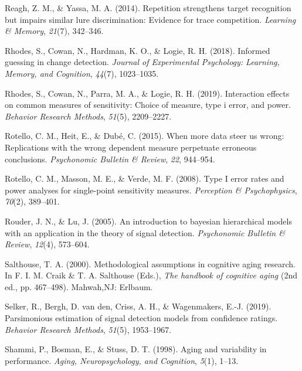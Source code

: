 \documentclass[
  english,
  ,man,floatsintext]{apa6}
\begin{document}
\leavevmode\hypertarget{ref-ReaghAndYassa2014}{}%
Reagh, Z. M., \& Yassa, M. A. (2014). Repetition strengthens target recognition but impairs similar lure discrimination: Evidence for trace competition. \emph{Learning \& Memory}, \emph{21}(7), 342--346.

\leavevmode\hypertarget{ref-RhodesEtAl2018}{}%
Rhodes, S., Cowan, N., Hardman, K. O., \& Logie, R. H. (2018). Informed guessing in change detection. \emph{Journal of Experimental Psychology: Learning, Memory, and Cognition}, \emph{44}(7), 1023--1035.

\leavevmode\hypertarget{ref-rhodes2019interaction}{}%
Rhodes, S., Cowan, N., Parra, M. A., \& Logie, R. H. (2019). Interaction effects on common measures of sensitivity: Choice of measure, type i error, and power. \emph{Behavior Research Methods}, \emph{51}(5), 2209--2227.

\leavevmode\hypertarget{ref-RotelloEtAl2015}{}%
Rotello, C. M., Heit, E., \& Dubé, C. (2015). When more data steer us wrong: Replications with the wrong dependent measure perpetuate erroneous conclusions. \emph{Psychonomic Bulletin \& Review}, \emph{22}, 944--954.

\leavevmode\hypertarget{ref-RotelloEtAl2008}{}%
Rotello, C. M., Masson, M. E., \& Verde, M. F. (2008). Type I error rates and power analyses for single-point sensitivity measures. \emph{Perception \& Psychophysics}, \emph{70}(2), 389--401.

\leavevmode\hypertarget{ref-rouder2005introduction}{}%
Rouder, J. N., \& Lu, J. (2005). An introduction to bayesian hierarchical models with an application in the theory of signal detection. \emph{Psychonomic Bulletin \& Review}, \emph{12}(4), 573--604.

\leavevmode\hypertarget{ref-Salthouse2000}{}%
Salthouse, T. A. (2000). Methodological assumptions in cognitive aging research. In F. I. M. Craik \& T. A. Salthouse (Eds.), \emph{The handbook of cognitive aging} (2nd ed., pp. 467--498). Mahwah,NJ: Erlbaum.

\leavevmode\hypertarget{ref-selker2019parsimonious}{}%
Selker, R., Bergh, D. van den, Criss, A. H., \& Wagenmakers, E.-J. (2019). Parsimonious estimation of signal detection models from confidence ratings. \emph{Behavior Research Methods}, \emph{51}(5), 1953--1967.

\leavevmode\hypertarget{ref-shammi1998aging}{}%
Shammi, P., Bosman, E., \& Stuss, D. T. (1998). Aging and variability in performance. \emph{Aging, Neuropsychology, and Cognition}, \emph{5}(1), 1--13.
\end{document}
